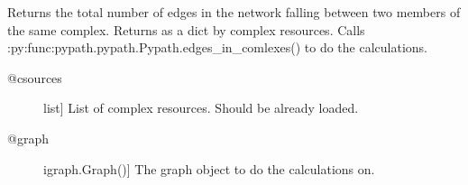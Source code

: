 \documentclass[letterpaper,10pt,english]{sphinxmanual}
\begin{document}
\begin{fulllineitems}
\begin{fulllineitems}
\begin{quote}
\begin{description}
\end{description}\end{quote}

\end{fulllineitems}


\begin{fulllineitems}
\label{\detokenize{main:pypath.main.PyPath.string_effects}}
\end{fulllineitems}


\begin{fulllineitems}
\label{\detokenize{main:pypath.main.PyPath.sum_in_complex}}
Returns the total number of edges in the network falling
between two members of the same complex.
Returns as a dict by complex resources.
Calls :py:func:pypath.pypath.Pypath.edges\_in\_comlexes()
to do the calculations.
\begin{description}
\item[{@csources}] \leavevmode{[}list{]}
List of complex resources. Should be already loaded.

\item[{@graph}] \leavevmode{[}igraph.Graph(){]}
The graph object to do the calculations on.

\end{description}

\end{fulllineitems}


\begin{fulllineitems}
\label{\detokenize{main:pypath.main.PyPath.table_latex}}
\end{fulllineitems}



\end{fulllineitems}
\end{document}
